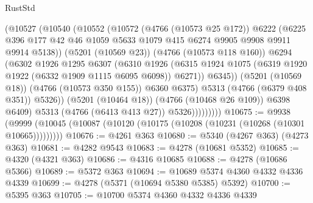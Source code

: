 \begin{lexlean}{RustStd}
\begin{coremodule}
                          (@10527
                            (@10540
                              (@10552
                                (@10572
                                  (@4766 (@10573 @25 @172))
                                  @6222
                                  (@6225
                                    @396
                                    @177
                                    @42
                                    @46
                                    @1059
                                    @5633
                                    @1079
                                    @415
                                    @6274
                                    @9905
                                    @9908
                                    @9911
                                    @9914
                                    @5138))
                                (@5201 (@10569 @23))
                                (@4766 (@10573 @118 @160))
                                @6294
                                (@6302
                                  @1926
                                  @1295
                                  @6307
                                  (@6310
                                    @1926
                                    (@6315
                                      @1924
                                      @1075
                                      (@6319 @1920 @1922 (@6332 @1909 @1115 @6095 @6098))
                                      @6271))
                                  @6345))
                              (@5201 (@10569 @18))
                              (@4766 (@10573 @350 @155))
                              @6360
                              @6375)
                            @5313
                            (@4766 (@6379 @408 @351))
                            @5326))
                        (@5201 (@10464 @18))
                        (@4766 (@10468 @26 @109))
                        @6398
                        @6409)
                      @5313
                      (@4766 (@6413 @413 @27))
                      @5326)))))))))
@10675 := @9938
    (@9999 (@10045 (@10087 (@10120 (@10175 (@10208 (@10231 (@10268 (@10301 @10665)))))))))
@10676 := @4261 @363
@10680 := @5340 (@4267 @363) (@4273 @363)
@10681 := @4282 @9543
@10683 := @4278 (@10681 @5352)
@10685 := @4320 (@4321 @363)
@10686 := @4316 @10685
@10688 := @4278 (@10686 @5366)
@10689 := @5372 @363
@10694 := @10689 @5374 @4360 @4332 @4336 @4339
@10699 := @4278 (@5371 (@10694 @5380 @5385) @5392)
@10700 := @5395 @363
@10705 := @10700 @5374 @4360 @4332 @4336 @4339

\end{coremodule}
\end{lexlean}
